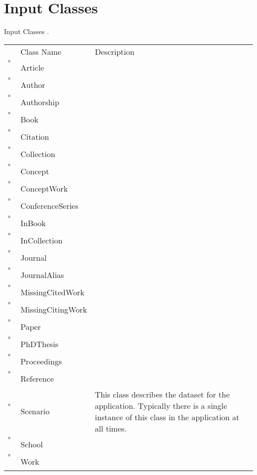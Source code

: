 \chapter{Input Classes}
Input Classes     .
\begin{longtable}{llp{8cm}}
& Class Name & Description \\
$\square$\ & Article &  \\
$\square$\ & Author &  \\
$\square$\ & Authorship &  \\
$\square$\ & Book &  \\
$\square$\ & Citation &  \\
$\square$\ & Collection &  \\
$\square$\ & Concept &  \\
$\square$\ & ConceptWork &  \\
$\square$\ & ConferenceSeries &  \\
$\square$\ & InBook &  \\
$\square$\ & InCollection &  \\
$\square$\ & Journal &  \\
$\square$\ & JournalAlias &  \\
$\square$\ & MissingCitedWork &  \\
$\square$\ & MissingCitingWork &  \\
$\square$\ & Paper &  \\
$\square$\ & PhDThesis &  \\
$\square$\ & Proceedings &  \\
$\square$\ & Reference &  \\
$\square$\ & Scenario & This class describes the dataset for the application. Typically there is a single instance of this class in the application at all times. \\
$\square$\ & School &  \\
$\square$\ & Work &  \\
\end{longtable}
